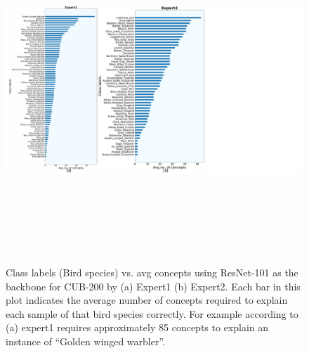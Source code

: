 \begin{figure}
\centering
\includegraphics[width=15cm, height=13cm]
{figures/Supp/Avg_concept_class_CNN_cub_1.pdf}
\caption{Class labels (Bird species) vs. avg concepts using ResNet-101 as the backbone for CUB-200 by (a) Expert1 (b) Expert2. Each bar in this plot indicates the average number of concepts required to explain each sample of that bird species correctly. For example according to (a) expert1 requires approximately 85 concepts to explain an instance of ``Golden winged warbler''.}
\label{fig:cnn_cub_concept_1_2}
\end{figure}

